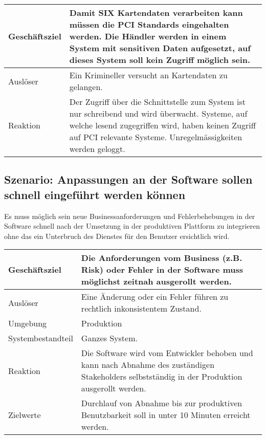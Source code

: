 \begin{table}[H]
	\centering
	\begin{tabular}{ | p{3cm} | p{11cm} | }
		\toprule
		Geschäftsziel & Damit SIX Kartendaten verarbeiten kann müssen die PCI Standards eingehalten werden. Die Händler werden in einem System mit sensitiven Daten aufgesetzt, auf dieses System soll kein Zugriff möglich sein. \\ \hline
		Auslöser & Ein Krimineller versucht an Kartendaten zu gelangen. \\ \hline
		Reaktion & Der Zugriff über die Schnittstelle zum System ist nur schreibend und wird überwacht. Systeme, auf welche lesend zugegriffen wird, haben keinen Zugriff auf PCI relevante Systeme. Unregelmässigkeiten werden geloggt. \\
		\bottomrule
	\end{tabular}
\end{table}

\subsection{Szenario: Anpassungen an der Software sollen schnell eingeführt werden können}

Es muss möglich sein neue Businessanforderungen und Fehlerbehebungen in der Software schnell nach der Umsetzung in der produktiven Plattform zu integrieren ohne das ein Unterbruch des Dienstes für den Benutzer ersichtlich wird.

\begin{table}[H]
	\centering
	\begin{tabular}{ | p{3cm} | p{11cm} | }
		\toprule
		Geschäftsziel & Die Anforderungen vom Business (z.B. Risk) oder Fehler in der Software muss möglichst zeitnah ausgerollt werden. \\ \hline
		Auslöser & Eine Änderung oder ein Fehler führen zu rechtlich inkonsistentem Zustand. \\ \hline
		Umgebung & Produktion\\ \hline
		Systembestandteil & Ganzes System. \\ \hline
		Reaktion & Die Software wird vom Entwickler behoben und kann nach Abnahme des zuständigen Stakeholders selbstständig in der Produktion ausgerollt werden. \\ \hline
		Zielwerte & Durchlauf von Abnahme bis zur produktiven Benutzbarkeit soll in unter 10 Minuten erreicht werden.\\
		\bottomrule
	\end{tabular}
\end{table}

